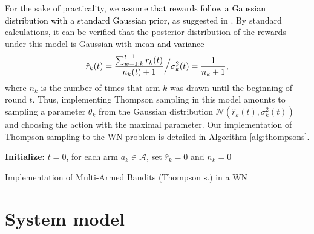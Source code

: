 \documentclass{article}
\begin{document}
	For the sake of practicality, we \textcolor{black}{assume that rewards follow a Gaussian distribution with a standard Gaussian prior,} as suggested in \cite{agrawal2013further}. By standard calculations, it can be verified that the posterior distribution of the rewards under this model is Gaussian with mean \textcolor{black}{and variance}
	\begin{equation}
	\textcolor{black}{\hat{r}_k(t) = \frac{\sum_{w=1:k}^{t-1} r_k(t) }{n_k(t) + 1} \Big/ \sigma_k^2(t) = \frac{1}{n_k + 1}},
	\nonumber
	\end{equation}
	where $n_k$ is the number of times that arm $k$ was drawn until the beginning of round $t$. Thus, implementing Thompson sampling in this model amounts to sampling a parameter $\theta_k$ from the Gaussian distribution $\mathcal{N}\left(\hat{r}_k(t),\sigma_k^2(t)\right)$ and choosing the action with the maximal parameter. Our implementation of Thompson sampling to the WN problem is detailed in Algorithm \ref{alg:thompsons}.
	
	\begin{algorithm}[]
		\SetAlgoLined
		\textbf{Initialize:} $t=0$,  for each arm $a_k \in \mathcal{A}$, set $\hat{r}_{k} = 0$ and $n_k = 0$ \\
		\caption{Implementation of Multi-Armed Bandits (Thompson \textcolor{black}{s.}) in a WN}
		\label{alg:thompsons}
	\end{algorithm}
	
	\section{System model}
	\label{section:system_model}	
	
\end{document}
